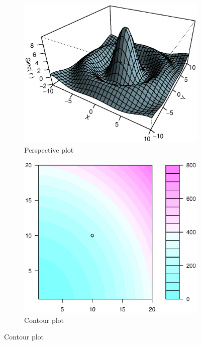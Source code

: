 \documentclass[lecture,12pt,]{pcms-l}
\numberwithin{section}{chapter}
\numberwithin{equation}{chapter}
\theoremstyle{plain}
\theoremstyle{definition}
\theoremstyle{definition}
\begin{document}
\begin{figure}[h!]
    \centering
    \begin{subfigure}[t]{0.45\textwidth}
        \includegraphics[width=\textwidth]{perspec}
        \caption{Perspective plot}
        \label{fig:perspective}
    \end{subfigure}
\begin{subfigure}[t]{0.45\textwidth}
        \includegraphics[width=\textwidth]{contour}
        \caption{Contour plot}
        \label{fig:contour}
    \end{subfigure}
\end{figure}
\end{document}
